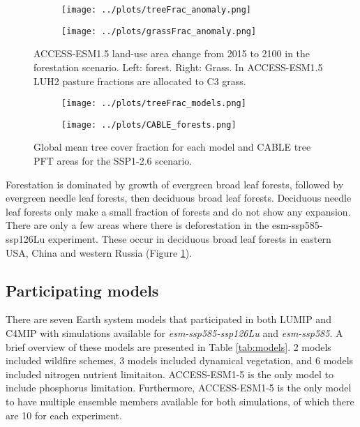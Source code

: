 \documentclass[]{article}
\begin{document}
\begin{figure}[H]
    \centering
    \begin{subfigure}[b]{0.45\linewidth}
        \texttt{[image: ../plots/treeFrac\_anomaly.png]}
    \end{subfigure}
    \begin{subfigure}[b]{0.45\linewidth}
        \texttt{[image: ../plots/grassFrac\_anomaly.png]}
    \end{subfigure}
    \caption{ACCESS-ESM1.5 land-use area change from 2015 to 2100 in the forestation scenario. Left: forest. Right: Grass. In ACCESS-ESM1.5 LUH2 pasture fractions are allocated to C3 grass.}
    \label{fig:land_use_map}
\end{figure}

\begin{figure}[H]
    \centering
    \begin{subfigure}[b]{0.45\linewidth}
        \texttt{[image: ../plots/treeFrac\_models.png]}
    \end{subfigure}
    \begin{subfigure}[b]{0.45\linewidth}
        \texttt{[image: ../plots/CABLE\_forests.png]}
    \end{subfigure}
    \caption{Global mean tree cover fraction for each model and CABLE tree PFT areas for the SSP1-2.6 scenario.}
    \label{fig:CABLE_PFTs}
\end{figure}

Forestation is dominated by growth of evergreen broad leaf forests, followed by evergreen needle leaf forests, then deciduous broad leaf forests.
Deciduous needle leaf forests only make a small fraction of forests and do not show any expansion.
There are only a few areas where there is deforestation in the esm-ssp585-ssp126Lu experiment.
These occur in deciduous broad leaf forests in eastern USA, China and western Russia (Figure \ref{fig:land_use_map}).

\subsection{Participating models}

There are seven Earth system models that participated in both LUMIP and C4MIP with simulations available for \textit{esm-ssp585-ssp126Lu} and \textit{esm-ssp585}.
A brief overview of these models are presented in Table \ref{tab:models}.
2 models included wildfire schemes, 3 models included dynamical vegetation, and 6 models included nitrogen nutrient limitaiton.
ACCESS-ESM1-5 is the only model to include phosphorus limitation.
Furthermore, ACCESS-ESM1-5 is the only model to have multiple ensemble members available for both simulations, of which there are 10 for each experiment.
\end{document}
